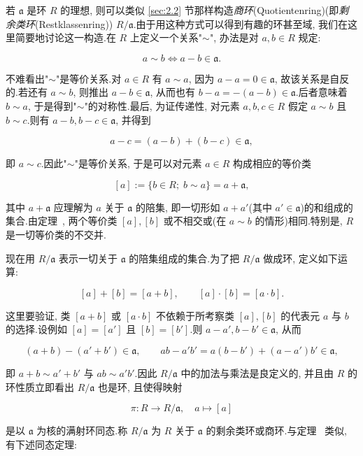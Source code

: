 若 $\mathfrak{a}$ 是环 $R$ 的理想, 则可以类似 \ref{sec:2.2} 节那样构造\emph{商环}(\textup{Quotientenring})(即\emph{剩余类环}(\textup{Restklassenring})) $R/\mathfrak{a}$.由于用这种方式可以得到有趣的环甚至域, 我们在这里简要地讨论这一构造.在 $R$ 上定义一个关系"$\sim$", 办法是对 $a, b \in R$ 规定:

\[
a \sim b \Longleftrightarrow a - b \in \mathfrak{a}\text{.}
\]

不难看出"$\sim$"是等价关系.对 $a \in R$ 有 $a \sim a$, 因为 $a - a = 0 \in \mathfrak{a}$, 故该关系是自反的.若还有 $a \sim b$, 则推出 $a - b \in \mathfrak{a}$, 从而也有 $b - a = -(a - b) \in \mathfrak{a}$.后者意味着 $b \sim a$, 于是得到"$\sim$"的对称性.最后, 为证传递性, 对元素 $a, b, c \in R$ 假定 $a \sim b$ 且 $b \sim c$.则有 $a - b, b - c \in \mathfrak{a}$, 并得到

\[
a - c = (a - b) + (b - c) \in \mathfrak{a},
\]

即 $a \sim c$.因此"$\sim$"是等价关系, 于是可以对元素 $a \in R$ 构成相应的等价类

\[
[a] := \{b \in R;\; b \sim a\} = a + \mathfrak{a},
\]

其中 $a + \mathfrak{a}$ 应理解为 $a$ 关于 $\mathfrak{a}$ 的陪集, 即一切形如 $a + a'$(其中 $a' \in \mathfrak{a}$)的和组成的集合.由定理~, 两个等价类 $[a], [b]$ 或不相交或(在 $a \sim b$ 的情形)相同.特别是, $R$ 是一切等价类的不交并.

现在用 $R/\mathfrak{a}$ 表示一切关于 $\mathfrak{a}$ 的陪集组成的集合.为了把 $R/\mathfrak{a}$ 做成环, 定义如下运算:

\[
[a] + [b] = [a + b], \qquad [a] \cdot [b] = [a \cdot b]\text{.}
\]

这里要验证, 类 $[a + b]$ 或 $[a \cdot b]$ 不依赖于所考察类 $[a], [b]$ 的代表元 $a$ 与 $b$ 的选择.设例如 $[a] = [a']$ 且 $[b] = [b']$.则 $a - a', b - b' \in \mathfrak{a}$, 从而

\[
(a + b) - (a' + b') \in \mathfrak{a}, \qquad ab - a'b' = a(b - b') + (a - a')b' \in \mathfrak{a},
\]

即 $a + b \sim a' + b'$ 与 $ab \sim a'b'$.因此 $R/\mathfrak{a}$ 中的加法与乘法是良定义的, 并且由 $R$ 的环性质立即看出 $R/\mathfrak{a}$ 也是环, 且使得映射

\[
\pi \colon R \longrightarrow R/\mathfrak{a}, \quad a \longmapsto [a]
\]

是以 $\mathfrak{a}$ 为核的满射环同态.称 $R/\mathfrak{a}$ 为 $R$ 关于 $\mathfrak{a}$ 的剩余类环或商环.与定理~ 类似, 有下述同态定理:

